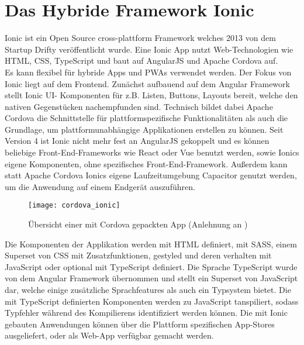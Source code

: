 \newpage

\section{Das Hybride Framework Ionic}

Ionic ist ein Open Source cross-plattform Framework welches 2013 von dem Startup Drifty veröffentlicht wurde. Eine Ionic App nutzt Web-Technologien wie \ac{HTML}, \ac{CSS}, TypeScript und baut auf AngularJS und Apache Cordova auf\cite{wiki_intro}. \\

Es kann flexibel für hybride Apps und \ac{PWA}s verwendet werden. Der Fokus von Ionic liegt auf dem Frontend. Zunächst aufbauend auf dem Angular Framework stellt Ionic \ac{UI}- Komponenten für z.B. Listen, Buttons, Layouts bereit, welche den nativen Gegenstücken nachempfunden sind. Technisch bildet dabei Apache Cordova die Schnittstelle für plattformspezifische Funktionalitäten als auch die Grundlage, um plattformunabhängige Applikationen erstellen zu können. Seit Version 4 ist Ionic nicht mehr fest an AngularJS gekoppelt und es können beliebige Front-End-Frameworks wie React oder Vue benutzt werden, sowie Ionics eigene Komponenten, ohne spezifisches Front-End-Framework. Außerdem kann statt Apache Cordova Ionics eigene Laufzeitumgebung Capacitor genutzt werden, um die Anwendung auf einem Endgerät auszuführen\cite{ionic_docs}\cite{ionic_intro}.\\

	\begin{figure}[h]
		\texttt{[image: cordova\_ionic]}
		\centering
		\caption[Übersicht einer mit Cordova gepackten App]{Übersicht einer mit Cordova gepackten App (Anlehnung an \cite{cordova_diagramm} )}
	\end{figure}

\newpage

Die Komponenten der Applikation werden mit \ac{HTML} definiert, mit \ac{SASS}, einem Superset von \ac{CSS} mit Zusatzfunktionen, gestyled und deren verhalten mit JavaScript oder optional mit TypeScript definiert. Die Sprache TypeScript wurde von dem Angular Framework übernommen und stellt ein Superset von JavaScript dar, welche einige zusätzliche Sprachfeatures als auch ein Typsystem bietet. Die mit TypeScript definierten Komponenten werden zu JavaScript tanspiliert, sodass Typfehler während des Kompilierens identifiziert werden können. Die mit Ionic gebauten Anwendungen können über die Plattform spezifischen App-Stores ausgeliefert, oder als Web-App verfügbar gemacht werden.


